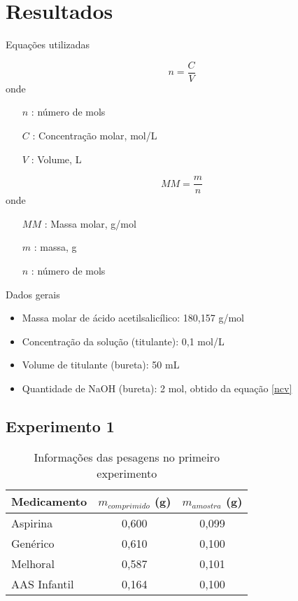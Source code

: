 \chapter{Resultados}\label{resultadosk}

Equações utilizadas

\begin{equation}\label{ncv}
     n = \frac{C}{V} 
\end{equation}
onde
\begin{itemize}
    \item[$n$ :] número de mols
    \item[$C$ :] Concentração molar, mol/L
    \item[$V$ :] Volume, L
\end{itemize}

\begin{equation}\label{massamolar}
    MM = \frac{m}{n} 
\end{equation}
onde
\begin{itemize}
    \item[$MM$ :] Massa molar, g/mol
    \item[$m$ :] massa, g
    \item[$n$ :] número de mols
\end{itemize}


\bigskip
Dados gerais

\begin{itemize}
     \item Massa molar de ácido acetilsalicílico: 180,157 g/mol
     \item Concentração da solução (titulante): 0,1 mol/L
     \item Volume de titulante (bureta): 50 mL
     \item Quantidade de NaOH (bureta): 2 mol, obtido da equação \eqref{ncv}
\end{itemize}

\section{Experimento 1}\label{res_exp1}

\begin{table}[H]\label{t:peso_1}
    \centering
    \begin{tabular}{l c c}
       \toprule
       Medicamento & $m_{comprimido}$ (g) & $m_{amostra}$ (g) \\
       \midrule
       Aspirina\R & 0,600 & 0,099  \\
       Genérico & 0,610 & 0,100  \\
       Melhoral\R & 0,587 & 0,101 \\
       AAS Infantil & 0,164 & 0,100 \\
        \bottomrule
    \end{tabular}
    \caption{Informações das pesagens no primeiro experimento}
\end{table}

